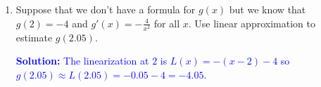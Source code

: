 \documentclass[letterpaper,11pt]{article}
\newcommand{\sol}[2]{\begin{minipage}[c][#1]{\linewidth}{\textcolor{blue}{\textbf{Solution:}}\quad \textcolor{blue}{#2}}\end{minipage}}
\newcommand{\sol}[2]{\begin{minipage}[c][#1]{\linewidth}{\vfill}\end{minipage}}
\begin{document}
\begin{enumerate}
    \newpage
    \item Suppose that we don't have a formula for $g(x)$ but we know that $g(2)=-4$ and $g'(x) = -\frac{4}{x^2}$ for all $x$. Use linear approximation to estimate $g(2.05)$.
    
    \sol{}{
    The linearization at $2$ is $L(x) = -(x-2) -4$ so $g(2.05) \approx L(2.05) = -0.05 - 4 = -4.05$.
    }
\end{enumerate}
\end{document}
